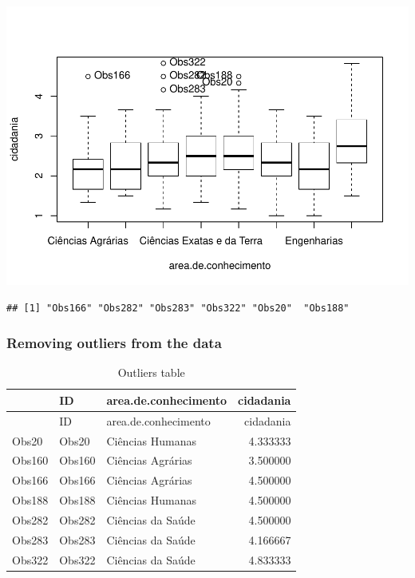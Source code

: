 \documentclass[]{article}
\newenvironment{Shaded}{\begin{snugshade}}{\end{snugshade}}
\newcommand{\CommentTok}[1]{\textcolor[rgb]{0.56,0.35,0.01}{\textit{#1}}}
\newcommand{\KeywordTok}[1]{\textcolor[rgb]{0.13,0.29,0.53}{\textbf{#1}}}
\newcommand{\NormalTok}[1]{#1}
\newcommand{\OperatorTok}[1]{\textcolor[rgb]{0.81,0.36,0.00}{\textbf{#1}}}
\newcommand{\StringTok}[1]{\textcolor[rgb]{0.31,0.60,0.02}{#1}}
\begin{document}
\includegraphics{factorialAnova_files/figure-latex/unnamed-chunk-3-1.pdf}

\begin{verbatim}
## [1] "Obs166" "Obs282" "Obs283" "Obs322" "Obs20"  "Obs188"
\end{verbatim}

\hypertarget{removing-outliers-from-the-data}{%
\subsubsection{Removing outliers from the
data}\label{removing-outliers-from-the-data}}

\begin{Shaded}
\end{Shaded}

\begin{longtable}[]{@{}lllr@{}}
\caption{Outliers table}\tabularnewline
\toprule
& ID & area.de.conhecimento & cidadania\tabularnewline
\midrule
\endfirsthead
\toprule
& ID & area.de.conhecimento & cidadania\tabularnewline
\midrule
\endhead
Obs20 & Obs20 & Ciências Humanas & 4.333333\tabularnewline
Obs160 & Obs160 & Ciências Agrárias & 3.500000\tabularnewline
Obs166 & Obs166 & Ciências Agrárias & 4.500000\tabularnewline
Obs188 & Obs188 & Ciências Humanas & 4.500000\tabularnewline
Obs282 & Obs282 & Ciências da Saúde & 4.500000\tabularnewline
Obs283 & Obs283 & Ciências da Saúde & 4.166667\tabularnewline
Obs322 & Obs322 & Ciências da Saúde & 4.833333\tabularnewline
\bottomrule
\end{longtable}
\end{document}
